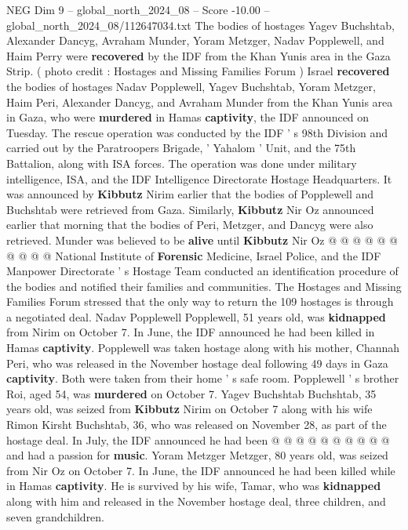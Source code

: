 \begin{textsample}{NEG Dim 9 – global\_north\_2024\_08 – Score -10.00 – global\_north\_2024\_08/112647034.txt}  \label{ex:f9_neg_081}
The bodies of hostages Yagev Buchshtab, Alexander Dancyg, Avraham Munder, Yoram Metzger, Nadav Popplewell, and Haim Perry were \textbf{recovered} by the IDF from the Khan Yunis area in the Gaza Strip. ( photo credit : Hostages and Missing Families Forum ) Israel \textbf{recovered} the bodies of hostages Nadav Popplewell, Yagev Buchshtab, Yoram Metzger, Haim Peri, Alexander Dancyg, and Avraham Munder from the Khan Yunis area in Gaza, who were \textbf{murdered} in Hamas \textbf{captivity}, the IDF announced on Tuesday.
The rescue operation was conducted by the IDF ' s 98th Division and carried out by the Paratroopers Brigade, ' Yahalom ' Unit, and the 75th Battalion, along with ISA forces.
The operation was done under military intelligence, ISA, and the IDF Intelligence Directorate Hostage Headquarters.
It was announced by \textbf{Kibbutz} Nirim earlier that the bodies of Popplewell and Buchshtab were retrieved from Gaza.
Similarly, \textbf{Kibbutz} Nir Oz announced earlier that morning that the bodies of Peri, Metzger, and Dancyg were also retrieved.
Munder was believed to be \textbf{alive} until \textbf{Kibbutz} Nir Oz @ @ @ @ @ @ @ @ @ @ National Institute of \textbf{Forensic} Medicine, Israel Police, and the IDF Manpower Directorate ' s Hostage Team conducted an identification procedure of the bodies and notified their families and communities.
The Hostages and Missing Families Forum stressed that the only way to return the 109 hostages is through a negotiated deal.
Nadav Popplewell Popplewell, 51 years old, was \textbf{kidnapped} from Nirim on October 7.
In June, the IDF announced he had been killed in Hamas \textbf{captivity}.
Popplewell was taken hostage along with his mother, Channah Peri, who was released in the November hostage deal following 49 days in Gaza \textbf{captivity}.
Both were taken from their home ' s safe room.
Popplewell ' s brother Roi, aged 54, was \textbf{murdered} on October 7.
Yagev Buchshtab Buchshtab, 35 years old, was seized from \textbf{Kibbutz} Nirim on October 7 along with his wife Rimon Kirsht Buchshtab, 36, who was released on November 28, as part of the hostage deal.
In July, the IDF announced he had been @ @ @ @ @ @ @ @ @ @ and had a passion for \textbf{music}.
Yoram Metzger Metzger, 80 years old, was seized from Nir Oz on October 7.
In June, the IDF announced he had been killed while in Hamas \textbf{captivity}.
He is survived by his wife, Tamar, who was \textbf{kidnapped} along with him and released in the November hostage deal, three children, and seven grandchildren.

\end{textsample}
